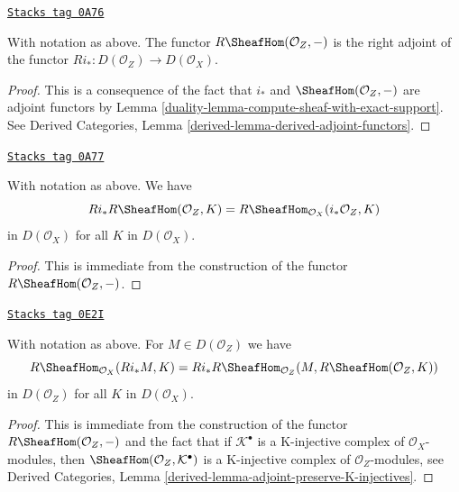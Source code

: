 \begin{lemma}
\label{duality-lemma-sheaf-with-exact-support-adjoint}
\href{https://stacks.math.columbia.edu/tag/0A76}{\texttt{Stacks tag 0A76}}

With notation as above. The functor $R\SheafHom(\mathcal{O}_Z, -)$
is the right adjoint of the functor
$Ri_* : D(\mathcal{O}_Z) \to D(\mathcal{O}_X)$.
\end{lemma}

\begin{proof}

This is a consequence of the fact that $i_*$ and
$\SheafHom(\mathcal{O}_Z, -)$ are adjoint functors by
Lemma \ref{duality-lemma-compute-sheaf-with-exact-support}. See
Derived Categories, Lemma \ref{derived-lemma-derived-adjoint-functors}.
\end{proof}

\begin{lemma}
\label{duality-lemma-sheaf-with-exact-support-ext}
\href{https://stacks.math.columbia.edu/tag/0A77}{\texttt{Stacks tag 0A77}}

With notation as above. We have
$$
Ri_*R\SheafHom(\mathcal{O}_Z, K) =
R\SheafHom_{\mathcal{O}_X}(i_*\mathcal{O}_Z, K)
$$
in $D(\mathcal{O}_X)$ for all $K$ in $D(\mathcal{O}_X)$.
\end{lemma}

\begin{proof}
This is immediate from the construction of the functor
$R\SheafHom(\mathcal{O}_Z, -)$.
\end{proof}

\begin{lemma}
\label{duality-lemma-sheaf-with-exact-support-internal-home}
\href{https://stacks.math.columbia.edu/tag/0E2I}{\texttt{Stacks tag 0E2I}}

With notation as above. For $M \in D(\mathcal{O}_Z)$ we have
$$
R\SheafHom_{\mathcal{O}_X}(Ri_*M, K) =
Ri_*R\SheafHom_{\mathcal{O}_Z}(M, R\SheafHom(\mathcal{O}_Z, K))
$$
in $D(\mathcal{O}_Z)$ for all $K$ in $D(\mathcal{O}_X)$.
\end{lemma}

\begin{proof}
This is immediate from the construction of the functor
$R\SheafHom(\mathcal{O}_Z, -)$ and the fact that if
$\mathcal{K}^\bullet$ is a K-injective complex of
$\mathcal{O}_X$-modules, then $\SheafHom(\mathcal{O}_Z, \mathcal{K}^\bullet)$
is a K-injective complex of $\mathcal{O}_Z$-modules, see
Derived Categories, Lemma \ref{derived-lemma-adjoint-preserve-K-injectives}.
\end{proof}

